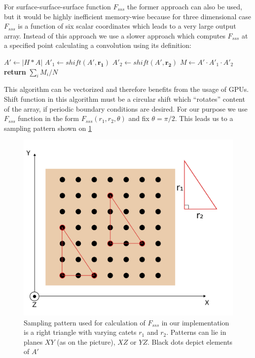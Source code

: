 \documentclass[reprint,amsmath,amssymb,aps,pre,showkeys,showpacs]{revtex4-1}
\begin{document}
For surface-surface-surface function $F_{sss}$ the former approach can also be
used, but it would be highly inefficient memory-wise because for three
dimensional case $F_{sss}$ is a function of six scalar coordinates which leads
to a very large output array. Instead of this approach we use a slower approach
which computes $F_{sss}$ at a specified point calculating a convolution using
its definition:
\begin{algorithmic}[1]
  \State $A' \gets |H*A|$
  \State $A'_1 \gets shift(A', \bm{r_1})$
  \State $A'_2 \gets shift(A', \bm{r_2})$
  \State $M \gets A' \cdot A'_1 \cdot A'_2$
  \State \textbf{return} $\sum_{i} M_{i} / N$
  \EndProcedure
\end{algorithmic}
This algorithm can be vectorized and therefore benefits from the usage of
GPUs. Shift function in this algorithm must be a circular shift which
``rotates'' content of the array, if periodic boundary conditions are
desired. For our purpose we use $F_{sss}$ function in the form
$F_{sss}(r_1, r_2, \theta)$ and fix $\theta = \pi/2$. This leads us to a
sampling pattern shown on \cref{fig:Fsss-pattern}
\begin{figure}
  \centering
  \includegraphics[width=0.8\linewidth]{images/pattern.png}
  \caption[]{Sampling pattern used for calculation of $F_{sss}$ in our
    implementation is a right triangle with varying catets $r_1$ and
    $r_2$. Patterns can lie in planes $XY$ (as on the picture), $XZ$ or
    $YZ$. Black dots depict elements of $A'$}
  \label{fig:Fsss-pattern}
\end{figure}
\end{document}
